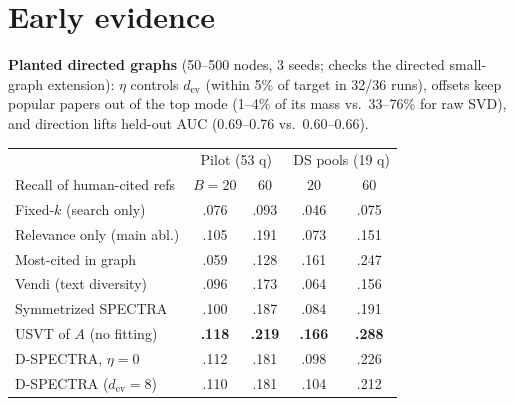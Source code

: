 \documentclass[10pt]{article}
\begin{document}
\section{Early evidence}
\textbf{Planted directed graphs} (50--500 nodes, 3 seeds; checks the directed small-graph extension): $\eta$ controls $d_{\mathrm{ev}}$ (within 5\% of target in 32/36 runs), offsets keep popular papers out of the top mode (1--4\% of its mass vs.\ 33--76\% for raw SVD), and direction lifts held-out AUC (0.69--0.76 vs.\ 0.60--0.66).
\begin{table}
\vspace{-12pt}
\centering\footnotesize
\setlength{\tabcolsep}{3.5pt}
\begin{tabular}{@{}lcccc@{}}
\toprule
& \multicolumn{2}{c}{Pilot (53 q)} & \multicolumn{2}{c}{DS pools (19 q)}\\
Recall of human-cited refs & $B{=}20$ & $60$ & $20$ & $60$\\
\midrule
Fixed-$k$ (search only) & .076 & .093 & .046 & .075\\
Relevance only (main abl.) & .105 & .191 & .073 & .151\\
Most-cited in graph & .059 & .128 & .161 & .247\\
Vendi (text diversity) & .096 & .173 & .064 & .156\\
Symmetrized SPECTRA & .100 & .187 & .084 & .191\\
USVT of $A$ (no fitting) & \textbf{.118} & \textbf{.219} & \textbf{.166} & \textbf{.288}\\
D-SPECTRA, $\eta{=}0$ & .112 & .181 & .098 & .226\\
D-SPECTRA ($d_{\mathrm{ev}}{=}8$) & .110 & .181 & .104 & .212\\
\bottomrule
\end{tabular}
\vspace{-8pt}
\end{table}
\end{document}
